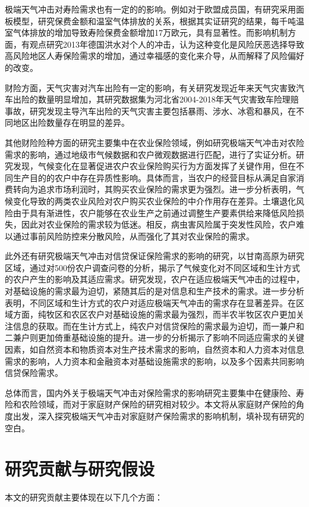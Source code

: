 极端天气冲击对寿险需求也有一定的的影响。例如对于欧盟成员国，有研究采用面板模型，研究保费金额和温室气体排放的关系\citep{melnychenko2021influence}，根据其实证研究的结果，每千吨温室气体排放的增加导致寿险保费金额增加17万欧元，具有显著性。而影响机制方面，有观点研究2013年德国洪水对个人的冲击\citep{avdeenko2021impact}，认为这种变化是风险厌恶选择导致高风险地区人寿保险需求的增加，通过幸福感的变化来介导，从而解释了风险偏好的改变。

财险方面，天气灾害对汽车出险有一定的影响，有关研究发现近年来天气灾害致汽车出险的数量明显增加\citep{张翠华2020天气灾害致车险理赔的风险分析}，其研究数据集为河北省2004-2018年天气灾害致车险理赔事故，研究发现主导汽车出险的天气灾害主要包括暴雨、涉水、冰雹和暴风，在不同地区出险数量存在明显的差异。

其他财险险种方面的研究主要集中在农业保险领域，例如研究极端天气冲击对农险需求的影响\citep{胡新艳2021气候变化}，通过地级市气候数据和农户微观数据进行匹配，进行了实证分析。研究发现，气候变化在显著促进农户农业保险购买行为方面发挥了关键作用，但在不同生产目的的农户中存在异质性影响。具体而言，当农户的经营目标从满足自家消费转向为追求市场利润时，其购买农业保险的需求更为强烈。进一步分析表明，气候变化导致的两类农业风险对农户购买农业保险的中介作用存在差异。土壤退化风险由于具有渐进性，农户能够在农业生产之前通过调整生产要素供给来降低风险损失，因此对农业保险的需求较为低迷。相反，病虫害风险属于突发性风险，农户难以通过事前风险防控来分散风险，从而强化了其对农业保险的需求。

此外还有研究极端天气冲击对信贷保证保险需求的影响的研究\citep{张钦2017高寒生态脆弱区农户对气候变化的适应需求}，以甘南高原为研究区域，通过对500份农户调查问卷的分析，揭示了气候变化对不同区域和生计方式的农户产生的影响及其适应需求。研究发现，农户在适应极端天气冲击的过程中，对基础设施的需求最为迫切，紧随其后的是对信息和生产技术的需求。进一步分析表明，不同区域和生计方式的农户对适应极端天气冲击的需求存在显著差异。在区域方面，纯牧区和农区农户对基础设施的需求最为强烈，而半农半牧区农户更加关注信息的获取。而在生计方式上，纯农户对信贷保险的需求最为迫切，而一兼户和二兼户则更加倚重基础设施的提升。进一步的分析揭示了影响不同适应需求的关键因素，如自然资本和物质资本对生产技术需求的影响，自然资本和人力资本对信息需求的影响，人力资本和金融资本对基础设施需求的影响，以及多个因素共同影响信贷保险需求。

总体而言，国内外关于极端天气冲击对保险需求的影响研究主要集中在健康险、寿险和农险领域，而对于家庭财产保险的研究相对较少。本文将从家庭财产保险的角度出发，深入探究极端天气冲击对家庭财产保险需求的影响机制，填补现有研究的空白。

\section{研究贡献与研究假设}
本文的研究贡献主要体现在以下几个方面：

